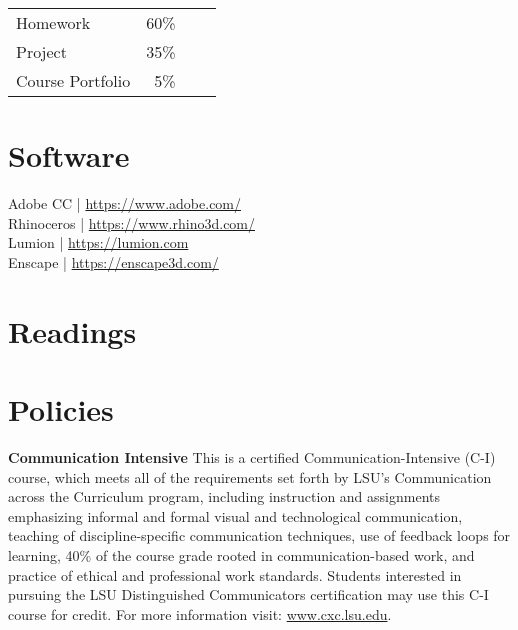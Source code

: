 \documentclass[11pt,article,oneside]{memoir}
\begin{document}
\begin{table}[H]
\begin{tabular}{l r @{\hskip 2cm} l @{\hskip 0.5cm} l}
Homework& 60\%\\
Project & 35\%\\
Course Portfolio & 5\%\\
\end{tabular}
\end{table}

\section{Software}
\begin{multicols}{2}
\raggedright
Adobe CC | \url{https://www.adobe.com/}\\
Rhinoceros | \url{https://www.rhino3d.com/}\\
Lumion | \url{https://lumion.com}\\
Enscape | \url{https://enscape3d.com/}\\
\end{multicols}


\section{Readings}
\vspace*{0.5cm}
\nocite{*}
\setlength{}
\printbibliography[heading=none]


\section{Policies}

\noindent \textbf{Communication Intensive}
This is a certified Communication-Intensive (C-I) course,
which meets all of the requirements set
forth by LSU’s Communication across the Curriculum program, 
including instruction and assignments emphasizing
informal and formal visual and technological communication,
teaching of discipline-specific communication techniques,
use of feedback loops for learning,
40\% of the course grade rooted in communication-based work, 
and practice of ethical and professional work standards.
Students interested in pursuing the LSU Distinguished Communicators 
certification may use this C-I course for credit. 
For more information visit: 
\url{www.cxc.lsu.edu}.\\
\end{document}
